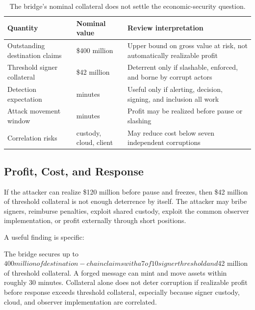 \begin{table}[htbp]
\centering
\small
\renewcommand{\arraystretch}{1.16}
\begin{tabularx}{\textwidth}{@{}>{\RaggedRight\arraybackslash}p{}>{\RaggedRight\arraybackslash}p{}X@{}}
\toprule
Quantity & Nominal value & Review interpretation \\
\midrule
Outstanding destination claims & \$400 million & Upper bound on gross value at risk, not automatically realizable profit \\
Threshold signer collateral & \$42 million & Deterrent only if slashable, enforced, and borne by corrupt actors \\
Detection expectation & 15 minutes & Useful only if alerting, decision, signing, and inclusion all work \\
Attack movement window & 30 minutes & Profit may be realized before pause or slashing \\
Correlation risks & custody, cloud, client & May reduce cost below seven independent corruptions \\
\bottomrule
\end{tabularx}
\caption{The bridge's nominal collateral does not settle the economic-security question.}
\end{table}

\subsection{Profit, Cost, and Response}

If the attacker can realize \$120 million before pause and freezes, then \$42 million of threshold collateral is not enough deterrence by itself. The attacker may bribe signers, reimburse penalties, exploit shared custody, exploit the common observer implementation, or profit externally through short positions.

A useful finding is specific:

\begin{codeblock}
The bridge secures up to $400 million of destination-chain claims with a
7 of 10 signer threshold and $42 million of threshold collateral. A forged
message can mint and move assets within roughly 30 minutes. Collateral
alone does not deter corruption if realizable profit before response
exceeds threshold collateral, especially because signer custody, cloud,
and observer implementation are correlated.
\end{codeblock}

